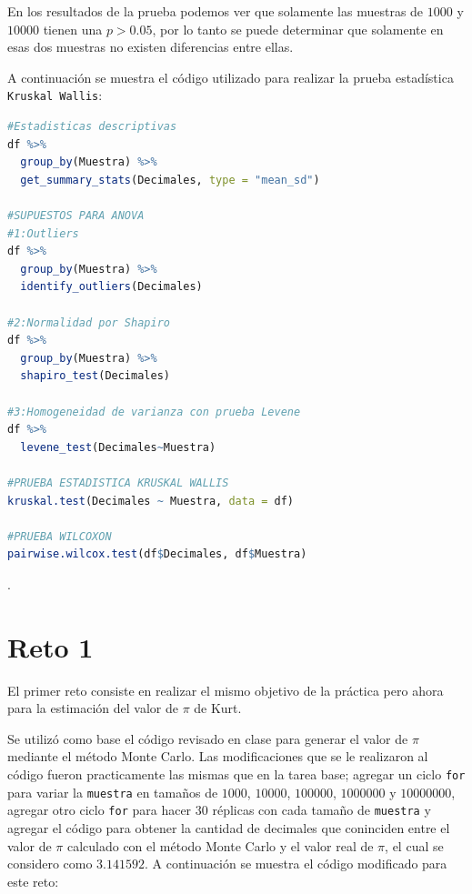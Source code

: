 \documentclass{article}
\begin{document}
En los resultados de la prueba podemos ver que solamente las muestras de $1000$ y $10000$ tienen una $p > 0.05$, por lo tanto se puede determinar que solamente en esas dos muestras no existen diferencias entre ellas. 
\bigskip

A continuación se muestra el código utilizado para realizar la prueba estadística \texttt{Kruskal Wallis}:

\lstset{style=mystyle}
\begin{lstlisting}[language=R, caption= Código para la prueba estadística \texttt{Kruskal Wallis} y la prueba \texttt{Wilcoxon}.]
#Estadisticas descriptivas
df %>%
  group_by(Muestra) %>%
  get_summary_stats(Decimales, type = "mean_sd")

#SUPUESTOS PARA ANOVA
#1:Outliers
df %>%
  group_by(Muestra) %>%
  identify_outliers(Decimales)

#2:Normalidad por Shapiro
df %>%
  group_by(Muestra) %>%
  shapiro_test(Decimales)

#3:Homogeneidad de varianza con prueba Levene
df %>%
  levene_test(Decimales~Muestra)

#PRUEBA ESTADISTICA KRUSKAL WALLIS
kruskal.test(Decimales ~ Muestra, data = df)

#PRUEBA WILCOXON
pairwise.wilcox.test(df$Decimales, df$Muestra)
\end{lstlisting}

\newpage
.
\bigskip

\section{Reto 1}

El primer reto consiste en realizar el mismo objetivo de la práctica pero ahora para la estimación del valor de $\pi$ de Kurt.
\bigskip

Se utilizó como base el código revisado en clase \citep{3} para generar el valor de $\pi$ mediante el método Monte Carlo. Las modificaciones que se le realizaron al código fueron practicamente las mismas que en la tarea base; agregar un ciclo \texttt{for} para variar la \texttt{muestra} en tamaños de $1000$, $10000$, $100000$, $1000000$ y $10000000$, agregar otro ciclo \texttt{for} para hacer $30$ réplicas con cada tamaño de \texttt{muestra} y agregar el código para obtener la cantidad de decimales que coninciden entre el valor de $\pi$ calculado con el método Monte Carlo y el valor real de $\pi$, el cual se considero como $3.141592$. A continuación se muestra el código modificado para este reto:
\end{document}
